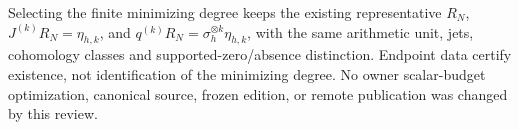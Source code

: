 Selecting the finite minimizing degree keeps the existing representative \(R_N\), \(J^{(k)}R_N=\eta_{h,k}\), and \(q^{(k)}R_N=\sigma_h^{\otimes k}\eta_{h,k}\), with the same arithmetic unit, jets, cohomology classes and supported-zero/absence distinction. Endpoint data certify existence, not identification of the minimizing degree. No owner scalar-budget optimization, canonical source, frozen edition, or remote publication was changed by this review.
\endgroup
